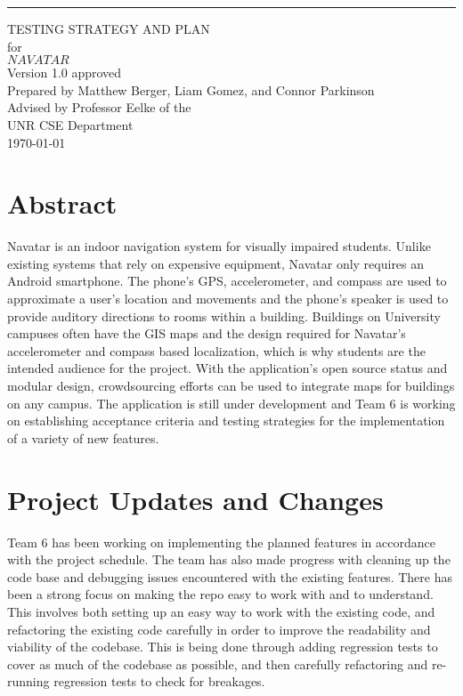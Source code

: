 \documentclass{scrreprt}
\date{}
\def\myversion{1.0 }
\begin{document}
\begin{flushright}
    \rule{16cm}{5pt}\vskip1cm
    \begin{bfseries}
        \Huge{TESTING STRATEGY AND PLAN}\\
        \vspace{1.6cm}
        for\\
        \vspace{1.6cm}
        $NAVATAR$\\
        \vspace{1.6cm}
        \LARGE{Version \myversion approved}\\
        \vspace{1.6cm}
        Prepared by Matthew Berger, Liam Gomez, and Connor Parkinson\\ 
        \vspace{1.6cm}
        Advised by Professor Eelke of the\\UNR CSE Department\\
        \vspace{1.6cm}
        \today\\
    \end{bfseries}
\end{flushright}

\tableofcontents

\chapter{Abstract}
Navatar is an indoor navigation system for visually impaired students. Unlike existing systems that rely on expensive equipment, Navatar only requires an Android smartphone. The phone’s GPS, accelerometer, and compass are used to approximate a user’s location and movements and the phone’s speaker is used to provide auditory directions to rooms within a building. Buildings on University campuses often have the GIS maps and the design required for Navatar’s accelerometer and compass based localization, which is why students are the intended audience for the project. With the application’s open source status and modular design, crowdsourcing efforts can be used to integrate maps for buildings on any campus. The application is still under development and Team 6 is working on establishing acceptance criteria and testing strategies for the implementation of a variety of new features.

\chapter{Project Updates and Changes}
Team 6 has been working on implementing the planned features in accordance with the project schedule. The team has also made progress with cleaning up the code base and debugging issues encountered with the existing features. There has been a strong focus on making the repo easy to work with and to understand. This involves both setting up an easy way to work with the existing code, and refactoring the existing code carefully in order to improve the readability and viability of the codebase. This is being done through adding regression tests to cover as much of the codebase as possible, and then carefully refactoring and re-running regression tests to check for breakages.
\end{document}
